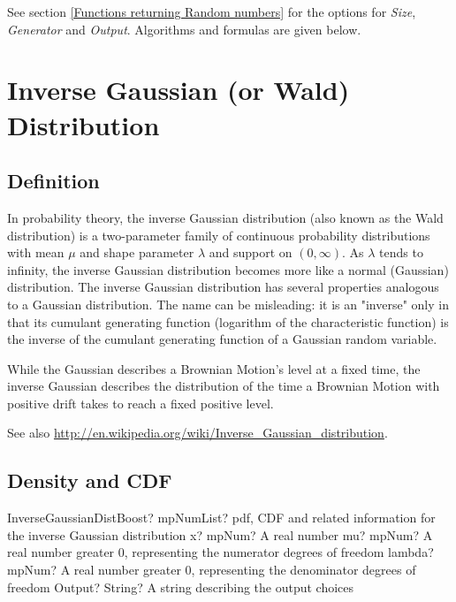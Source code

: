 \vspace{0.3cm}

See section \ref{Functions returning Random numbers} for the options for  {\itshape\sffamily Size},  {\itshape\sffamily Generator} and {\itshape\sffamily Output}. Algorithms and formulas are given below.




\newpage
\section{Inverse Gaussian (or Wald) Distribution}


\subsection{Definition}
\label{InverseGaussianDistributionDefinition}

In probability theory, the inverse Gaussian distribution (also known as the Wald distribution) is a two-parameter family of continuous probability distributions  with mean $\mu$ and shape parameter $\lambda$ and support on $(0,\infty)$.
As $\lambda$ tends to infinity, the inverse Gaussian distribution becomes more like a normal (Gaussian) distribution. The inverse Gaussian distribution has several properties analogous to a Gaussian distribution. The name can be misleading: it is an "inverse" only in that its cumulant generating function (logarithm of the characteristic function) is the inverse of the cumulant generating function of a Gaussian random variable.

While the Gaussian describes a Brownian Motion's level at a fixed time, the inverse Gaussian describes the distribution of the time a Brownian Motion with positive drift takes to reach a fixed positive level.

See also \href{http://en.wikipedia.org/wiki/Inverse_Gaussian_distribution}{http://en.wikipedia.org/wiki/Inverse\_Gaussian\_distribution}. 


\subsection{Density and CDF}

\begin{mpFunctionsExtract}
	\mpFunctionFourNotImplemented
	{InverseGaussianDistBoost? mpNumList? pdf, CDF and related information for the inverse Gaussian distribution}
	{x? mpNum? A real number}
	{mu? mpNum? A real number greater 0, representing the numerator  degrees of freedom}
	{lambda? mpNum? A real number greater 0, representing the denominator degrees of freedom}
	{Output? String? A string describing the output choices}
\end{mpFunctionsExtract}


